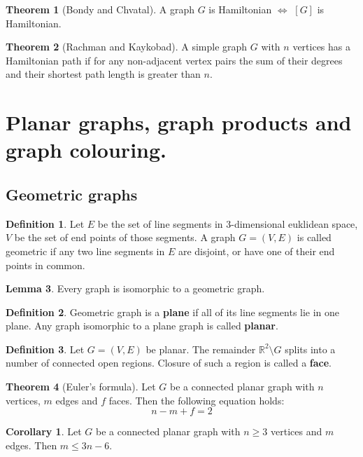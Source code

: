 \documentclass{article}
\theoremstyle{definition}
\newtheorem{theorem}{Theorem}[section]
\newtheorem{corollary}{Corollary}[section]
\newtheorem{lemma}[theorem]{Lemma}
\newtheorem{dd}{Definition}[section]
\begin{document}
\begin{theorem}[Bondy and Chvatal]
    A graph $G$ is Hamiltonian $\iff$ $[G]$ is Hamiltonian.
\end{theorem}

\begin{theorem}[Rachman and Kaykobad]
    A simple graph $G$ with $n$ vertices has a Hamiltonian path if for any non-adjacent vertex pairs the sum of their degrees and their shortest path length is greater than $n$.
\end{theorem}

\newpage
\section{Planar graphs, graph products and graph colouring.}

\subsection{Geometric graphs}

\begin{dd}
    Let $E$ be the set of line segments in 3-dimensional euklidean space, $V$ be the set of end points of those segments. A graph $G = (V, E)$ is called geometric if any two line segments in $E$ are disjoint, or have one of their end points in common.
\end{dd}

\begin{lemma}
    Every graph is isomorphic to a geometric graph.
\end{lemma}

\begin{dd}
    Geometric graph is a \textbf{plane} if all of its line segments lie in one plane. Any graph isomorphic to a plane graph is called \textbf{planar}.
\end{dd}

\begin{dd}
    Let $G = (V, E)$ be planar. The remainder $\mathbb{R}^2 \setminus G$ splits into a number of connected open regions. Closure of such a region is called a \textbf{face}.
\end{dd}

\begin{theorem}[Euler's formula]
    Let $G$ be a connected planar graph with $n$ vertices, $m$ edges and $f$ faces. Then the following equation holds: $$ n - m + f = 2 $$
\end{theorem}

\begin{corollary}
    Let $G$ be a connected planar graph with $n \geq 3$ vertices and $m$ edges. Then $m \leq 3n - 6$.
\end{corollary}
\end{document}
